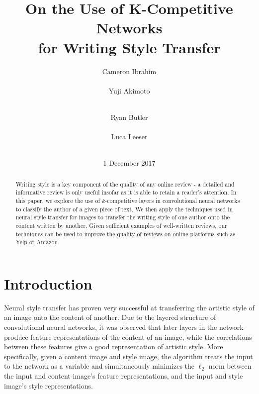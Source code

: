 \documentclass{vldb}
\begin{document}

\title{On the Use of K-Competitive Networks \\ for Writing Style Transfer}



\author{
\alignauthor
Cameron Ibrahim\\
       \\
\alignauthor
Yuji Akimoto\\
       \\
\and
\alignauthor 
Ryan Butler\\
       \\
\alignauthor 
Luca Leeser\\
       \\
}

\date{1 December 2017}

\maketitle

\begin{abstract}
Writing style is a key component of the quality of any online review - a detailed and informative review is only useful insofar as it is able to retain a reader's attention. In this paper, we explore the use of $k$-competitive layers in convolutional neural networks to classify the author of a given piece of text. We then apply the techniques used in neural style transfer for images to transfer the writing style of one author onto the content written by another. Given sufficient examples of well-written reviews, our techniques can be used to improve the quality of reviews on online platforms such as Yelp or Amazon.
\end{abstract}

\section{Introduction}
Neural style transfer \cite{GatysEB15a} has proven very successful at transferring the artistic style of an image onto the content of another. Due to the layered structure of convolutional neural networks, it was observed that later layers in the network produce feature representations of the content of an image, while the correlations between these features give a good representation of artistic style. More specifically, given a content image and style image, the algorithm treats the input to the network as a variable and simultaneously minimizes the $\ell_2$ norm between the input and content image's feature representations, and the input and style image's style representations.
\end{document}

